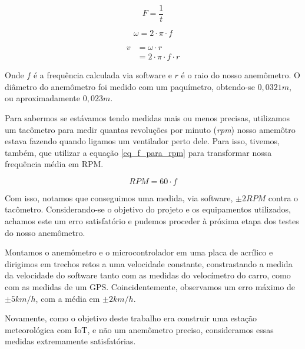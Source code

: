 \documentclass[twocolumn,11pt]{article}
\begin{document}
{\begin{equation}
F = \frac{1}{t}
\label{eq_frequencia}
\end{equation}

\begin{equation}
  \omega = 2 \cdot \pi \cdot f
  \label{eq_velocidade_angular}
\end{equation}

\begin{equation}\label{eq_velocidade_linear}
\begin{split}
v &= \omega \cdot r \\
 &= 2 \cdot \pi \cdot f \cdot r
\end{split}
\end{equation}

Onde $f$ é a frequência calculada via software e $r$ é o raio do nosso anemômetro. O diâmetro do anemômetro foi medido com um paquímetro, obtendo-se $0,0321 m$, ou aproximadamente $0,023 m$.\par

Para sabermos se estávamos tendo medidas mais ou menos precisas, utilizamos um tacômetro para medir quantas revoluções por minuto (\textit{rpm}) nosso amemôtro estava fazendo quando ligamos um ventilador perto dele. Para isso, tivemos, também, que utilizar a equação \ref{eq_f_para_rpm} para transformar nossa frequência média em RPM.\par

\begin{equation}
  RPM = 60 \cdot f
  \label{eq_f_para_rpm}
\end{equation}

Com isso, notamos que conseguimos uma medida, via software, $\pm 2 RPM$ contra o tacômetro. Considerando-se o objetivo do projeto e os equipamentos utilizados, achamos este um erro satisfatório e pudemos proceder à próxima etapa dos testes do nosso anemômetro.\par

Montamos o anemômetro e o microcontrolador em uma placa de acrílico e dirigimos em trechos retos a uma velocidade constante, constrastando a medida da velocidade do software tanto com as medidas do velocímetro do carro, como com as medidas de um GPS. Coincidentemente, observamos um erro máximo de $\pm 5 km/h$, com a média em $\pm 2 km/h$.\par

Novamente, como o objetivo deste trabalho era construir uma estação meteorológica com IoT, e não um anemômetro preciso, consideramos essas medidas extremamente satisfatórias.\par

}
\end{document}
